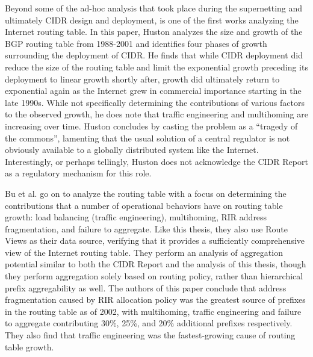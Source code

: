 Beyond some of the ad-hoc analysis that took place during the supernetting
\cite{rfc1338} and ultimately CIDR \cite{rfc1519} design and deployment,
\cite{Huston:2001bs} is one of the first works analyzing the Internet routing
table. In this paper, Huston analyzes the size and growth of the BGP routing
table from 1988-2001 and identifies four phases of growth surrounding the
deployment of CIDR. He finds that while CIDR deployment did reduce the size of
the routing table and limit the exponential growth preceding its deployment to
linear growth shortly after, growth did ultimately return to exponential again
as the Internet grew in commercial importance starting in the late 1990s. While
not specifically determining the contributions of various factors to the
observed growth, he does note that traffic engineering and multihoming are
increasing over time. Huston concludes by casting the problem as a ``tragedy of
the commons'', lamenting that the usual solution of a central regulator is not
obviously available to a globally distributed system like the Internet.
Interestingly, or perhaps tellingly, Huston does not acknowledge the CIDR
Report as a regulatory mechanism for this role.

Bu et al. \cite{Bu:2004fk} go on to analyze the routing table with a focus on
determining the contributions that a number of operational behaviors have on
routing table growth: load balancing (traffic engineering), multihoming, RIR
address fragmentation, and failure to aggregate. Like this thesis, they also
use Route Views as their data source, verifying that it provides a sufficiently
comprehensive view of the Internet routing table. They perform an analysis of
aggregation potential similar to both the CIDR Report and the analysis of this
thesis, though they perform aggregation solely based on routing policy, rather
than hierarchical prefix aggregability as well. The authors of this paper
conclude that address fragmentation caused by RIR allocation policy was the
greatest source of prefixes in the routing table as of 2002, with multihoming,
traffic engineering and failure to aggregate contributing 30\%, 25\%, and 20\%
additional prefixes respectively. They also find that traffic engineering was
the fastest-growing cause of routing table growth.

